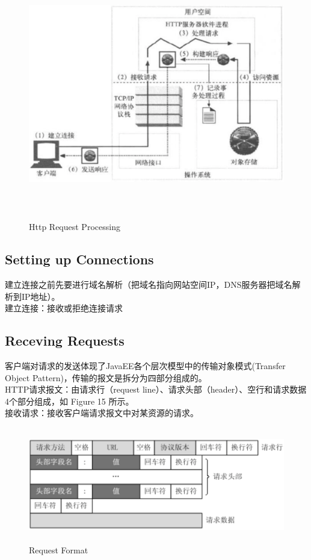 \documentclass{article}
\begin{document}
	\begin{figure}[H]
		\centering
		\includegraphics[height = 11cm, width = 16cm]{pics/27_http_procedure.png}	
		\caption{Http Request Processing}
	\end{figure}

	\subsection{Setting up Connections}
	\begin{CJK}{UTF8}{gbsn}
		建立连接之前先要进行域名解析（把域名指向网站空间IP，DNS服务器把域名解析到IP地址）。\\
		建立连接：接收或拒绝连接请求
	\end{CJK}{}

	\subsection{Receving Requests}
	\begin{CJK}{UTF8}{gbsn}
		\indent 客户端对请求的发送体现了JavaEE各个层次模型中的传输对象模式(Transfer Object Pattern)，传输的报文是拆分为四部分组成的。\\
		\noindent HTTP请求报文：由请求行（request line）、请求头部（header）、空行和请求数据4个部分组成，如 Figure 15 所示。\\ 
		接收请求：接收客户端请求报文中对某资源的请求。
	\end{CJK}{}

	\begin{figure}[H]
		\centering
		\includegraphics[height = 5cm, width = 14cm]{pics/28_request_format.png}	
		\caption{Request Format}
	\end{figure}
\end{document}

